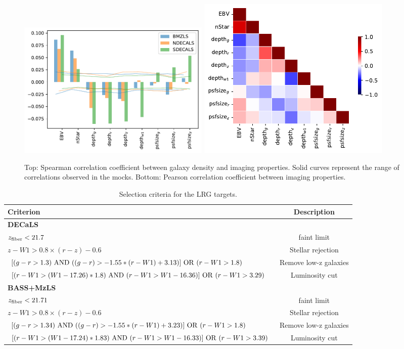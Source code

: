 \begin{figure}
    \includegraphics[width=0.45\textwidth]{figures/pcc.pdf} 
    \includegraphics[width=0.45\textwidth]{figures/pccx.pdf}     
    \caption{Top: Spearman correlation coefficient between galaxy density and imaging properties. Solid curves represent the range of correlations observed in the mocks. Bottom: Pearson correlation coefficient between imaging properties.}
    \label{fig:pcc}
\end{figure}






\begin{table}
  \begin{center}
    \caption{Selection criteria for the LRG targets.}
    \label{tab:ts}
    \begin{tabular}{lc}
    \hline
      \textbf{Criterion} &\textbf{Description}\\
      \hline   
     \textbf{DECaLS} & \\ 
     $z_{\rm fiber} < 21.7$  & faint limit  \\
     $z - W1 > 0.8 \times (r - z) - 0.6$ & Stellar rejection  \\
     $[(g-r >1.3)~{\rm AND}~((g-r) > -1.55*(r-W1) + 3.13)]~{\rm OR}~(r -W 1 > 1.8)$ & Remove low-z galaxies \\
     $[(r-W1 > (W1 - 17.26)*1.8)~{\rm AND}~(r - W1 > W1 - 16.36)]~{\rm OR}~(r-W1 > 3.29)$ & Luminosity cut \\ 
    \hline
     \textbf{BASS+MzLS} & \\ 
     $z_{\rm fiber} < 21.71$  & faint limit  \\
     $z - W1 > 0.8 \times (r - z) - 0.6$ & Stellar rejection  \\
     $[(g-r >1.34)~{\rm AND}~((g-r) > -1.55*(r-W1) + 3.23)]~{\rm OR}~(r -W 1 > 1.8)$ & Remove low-z galaxies \\
     $[(r-W1 > (W1 - 17.24)*1.83)~{\rm AND}~(r - W1 > W1 - 16.33)]~{\rm OR}~(r-W1 > 3.39)$ & Luminosity cut \\ 
      \hline
      \end{tabular}
  \end{center}
\end{table}


\clearpage